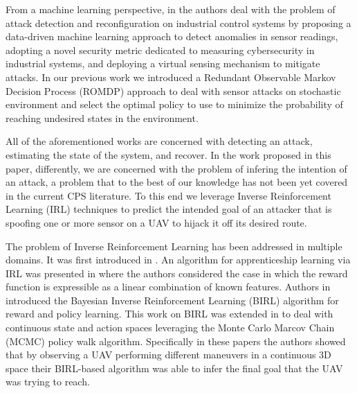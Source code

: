 \documentclass[letterpaper, 10 pt, conference]{ieeeconf}  %
\newcommand\NB[1]{$\spadesuit$\footnote{NB: #1}}
\begin{document}
From a machine learning perspective, in \cite{paridari2017framework} the authors deal with the problem of attack detection and reconfiguration on industrial control systems by proposing a data-driven machine learning approach to detect anomalies in sensor readings,  adopting a novel security metric dedicated to measuring cybersecurity in industrial systems, and deploying a virtual sensing mechanism to mitigate attacks. 
In our previous work \cite{bezzo2016stochastic} we introduced a Redundant Observable Markov Decision Process (ROMDP) approach to deal with sensor attacks on stochastic environment and select the optimal policy to use to minimize the probability of reaching undesired states in the environment. 

All of the aforementioned works are concerned with detecting an attack, estimating the state of the system, and recover. In the work proposed in this paper, differently, we are concerned with the problem of infering the intention of an attack, a problem that to the best of our knowledge has not been yet covered in the current CPS literature.
To this end we leverage Inverse Reinforcement Learning (IRL) techniques to predict the intended goal of an attacker that is spoofing one or more sensor on a UAV to hijack it off its desired route.
%

The problem of Inverse Reinforcement Learning has been addressed in multiple domains. It was first introduced in \cite{Ng2000}. An algorithm for apprenticeship learning via IRL was presented in \cite{Abbeel2004a} where the authors considered the case in which the reward function is expressible as a linear combination of known features. 
Authors in \cite{Ramachandran2007} introduced the Bayesian Inverse Reinforcement Learning (BIRL) algorithm for reward and policy learning. This work on BIRL was extended in \cite{Michini2015,Michini2013,Michini2012} to deal with continuous state and action spaces leveraging the Monte Carlo Marcov Chain (MCMC) policy walk algorithm. Specifically in these papers the authors  showed that by observing a UAV performing different maneuvers in a continuous 3D space their BIRL-based algorithm was able to infer the final goal that the UAV was trying to reach. 
\end{document}
